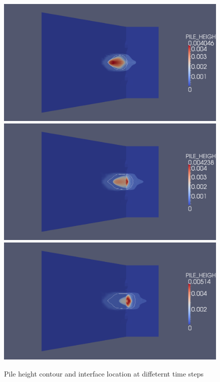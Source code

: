 \documentclass[letterpaper,10pt]{article}
\begin{document}
\begin{figure}[H]
\begin{minipage}[b]{.5\linewidth}
  \end{minipage}
  \begin{minipage}[b]{.5\linewidth}
    \centering
    \includegraphics[width=1\textwidth]{IMAGES/level_set/4.png}
    \includegraphics[width=1\textwidth]{IMAGES/level_set/5.png}
    \includegraphics[width=1\textwidth]{IMAGES/level_set/6.png}
  \end{minipage}
  \caption{Pile height contour and interface location at diffeternt time steps}
  \label{Phase field1}
\end{figure}
\end{document}

